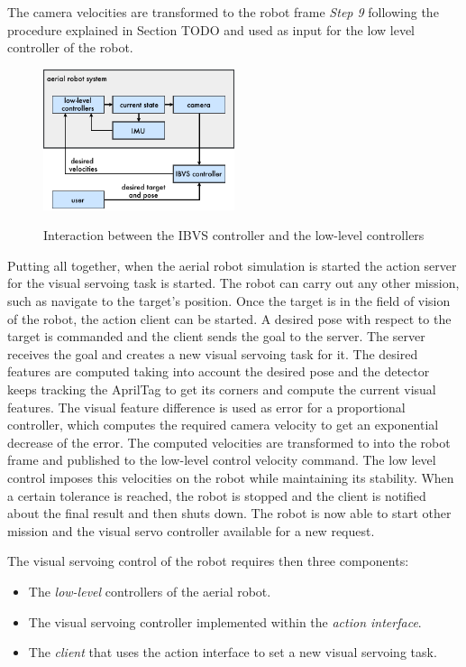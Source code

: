  The camera velocities are transformed to the robot frame \emph{Step 9} following the procedure explained in Section TODO and used as input for the low level controller of the robot.
	
\begin{figure}[!htb]
		\caption{Interaction between the IBVS controller and the low-level controllers}
	\centering
	\includegraphics[width=0.5\textwidth]{content/chapter_04/images/context_diagram.pdf}
	\label{fig:low-level-ibvs}
\end{figure}

Putting all together, when the aerial robot simulation is started the action server for the visual servoing task is started. The robot can carry out any other mission, such as navigate to the target's position. Once the target is in the field of vision of the robot, the action client can be started. A desired pose with respect to the target is commanded and the client sends the goal to the server. The server receives the goal and creates a new visual servoing task for it. The desired features are computed taking into account the desired pose and the detector keeps tracking the AprilTag to get its corners and compute the current visual features. The visual feature difference is used as error for a proportional controller, which computes the required camera velocity to get an exponential decrease of the error. The computed velocities are transformed to into the robot frame and published to the low-level control velocity command. The low level control imposes this velocities on the robot while maintaining its stability. When a certain tolerance is reached, the robot is stopped and the client is notified about the final result and then shuts down. The robot is now able to start other mission and the visual servo controller available for a new request.

The visual servoing control of the robot requires then three components:

\begin{itemize}
	\item The \emph{low-level} controllers of the aerial robot.
	
	\item The visual servoing controller implemented within the \emph{action interface}.
	
	\item The \emph{client} that uses the action interface to set a new visual servoing task.
\end{itemize}

